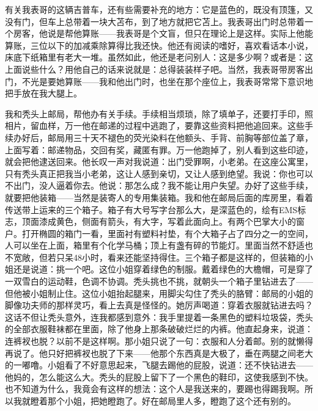 有关我表哥的这辆吉普车，还有些需要补充的地方：它是蓝色的，既没有顶篷，又没有门，但车上总带着一块大苫布，到了地方就把它苫上。我表哥出门时总带着一个房客，他说是帮他算账——我表哥是个文盲，但只在理论上是这样。实际上他能算账，三位以下的加减乘除算得比我还快。他还有阅读的嗜好，喜欢看话本小说，床底下纸箱里有老大一堆。虽然如此，他还是老问别人：这是多少啊？或者是：这上面说些什么？用他自己的话来说就是：总得装装样子吧。当然，我表哥带房客出门，不光是要她算账——我和他出门时，也坐在那个座位上，我表哥常常下意识地把手放在我大腿上。 



我和秃头上邮局，帮他办有关手续。手续相当烦琐，除了填单子，还要打手印，照相片，留血样，万一他在邮递的过程中逃跑了，要靠这些资料把他追回来。这些手续办好后，邮局用三十天不褪色的荧光染料在他额头、手背、前胸等部位盖了章，上面写着：邮递物品，交回有奖，藏匿有罪。万一他跑掉了，别人看到这些印迹，就会把他逮送回来。他长叹一声对我说道：出门受罪啊，小老弟。在这座公寓里，只有秃头真正把我当小老弟，这让人感到亲切，又让人感到绝望。我说：你也可以不出门，没人逼着你去。他说：那怎么成？我不能让用户失望。办好了这些手续，就要把他装箱——当然是装寄人的专用集装箱。我和他在邮局后面的库房里，看着传送带上运来的三个箱子。箱子有大号写字台那么大，是深蓝色的，绘有EMS标志，顶面漆成黄色，侧面有箭头，有大字，写着此面向上。有两个巴掌大小的窗户。打开椭圆的箱门一看，里面衬有塑料衬垫，有个大箱子占了四分之一的空间，人可以坐在上面，箱里有个化学马桶；顶上有盏有碎的节能灯。里面当然不舒适也不宽敞，但若只呆48小时，看来还能坚持得住。三个箱子都是这样的，但装箱的小姐还是说道：挑一个吧。这位小姐穿着绿色的制服。戴着绿色的大檐帽，可是穿了一双雪白的运动鞋，色调不协调。秃头挑也不挑，就朝头一个箱子里钻进去了——但他被小姐制止住。这位小姐抬起腿来，用脚尖勾住了秃头的胳臂：邮局的小姐的脚像功夫师的那样灵巧，看上去真是怪怪的。她厉声喝道：穿着衣服就钻进去吗？这话不但让秃头意外，连我都感到意外：我手里提着一条黑色的塑料垃圾袋，秃头的全部衣服鞋袜都在里面，除了他身上那条破破烂烂的内裤。他直起身来，说道：连裤衩也脱？以前不是这样啊。那小姐只说了一句：衣服和人分着邮。别的就懒得再说了。他只好把裤衩也脱了下来——他那个东西真是大极了，垂在两腿之间老大的一嘟噜。小姐看了不好意思起来，飞腿去踢他的屁股，说道：还不快钻进去——他妈的，怎么能这么大。秃头的屁股上留下了一个黑色的鞋印，这使我感到不快。也不知道为什么，我竟会有这样的想法：这个人是我送来的，要踢也得踢我啊。所以我就瞪着那个小姐，把她瞪跑了。好在邮局里人多，瞪跑了这个还有别的。 

